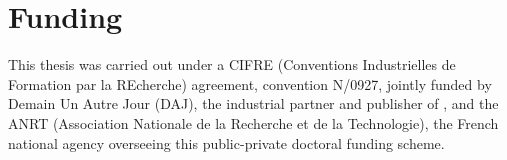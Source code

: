 \chapter*{Funding}

This thesis was carried out under a CIFRE (Conventions Industrielles de Formation par la REcherche) agreement, convention N/0927, jointly funded by Demain Un Autre Jour (DAJ), the industrial partner and publisher of \melody, and the ANRT (Association Nationale de la Recherche et de la Technologie), the French national agency overseeing this public-private doctoral funding scheme.

